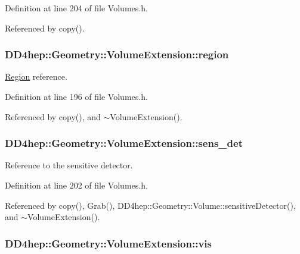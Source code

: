 Definition at line 204 of file Volumes.h.

Referenced by copy().\hypertarget{class_d_d4hep_1_1_geometry_1_1_volume_extension_ac4303caba2a748fd25e8c986c8001096}{
\subsubsection[{region}]{ {\bf DD4hep::Geometry::VolumeExtension::region}}}
\label{class_d_d4hep_1_1_geometry_1_1_volume_extension_ac4303caba2a748fd25e8c986c8001096}


\hyperlink{class_d_d4hep_1_1_geometry_1_1_region}{Region} reference. 

Definition at line 196 of file Volumes.h.

Referenced by copy(), and $\sim$VolumeExtension().\hypertarget{class_d_d4hep_1_1_geometry_1_1_volume_extension_a3b0ac7f31e5c962f0eb479c24d4c72ea}{
\subsubsection[{sens\_\-det}]{ {\bf DD4hep::Geometry::VolumeExtension::sens\_\-det}}}
\label{class_d_d4hep_1_1_geometry_1_1_volume_extension_a3b0ac7f31e5c962f0eb479c24d4c72ea}


Reference to the sensitive detector. 

Definition at line 202 of file Volumes.h.

Referenced by copy(), Grab(), DD4hep::Geometry::Volume::sensitiveDetector(), and $\sim$VolumeExtension().\hypertarget{class_d_d4hep_1_1_geometry_1_1_volume_extension_ae4a19cb963f258f84a6fa871e8b6f4c1}{
\subsubsection[{vis}]{ {\bf DD4hep::Geometry::VolumeExtension::vis}}}
\label{class_d_d4hep_1_1_geometry_1_1_volume_extension_ae4a19cb963f258f84a6fa871e8b6f4c1}


